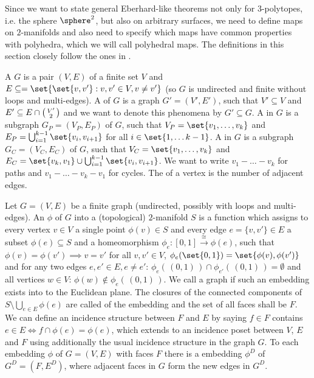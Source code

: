 \label{sec:polymap}

Since we want to state general {\sc Eberhard}-like theorems not only for $3$-polytopes, i.e. the sphere $\sphere^2$, but also on arbitrary surfaces, we need to define maps on $2$-manifolds and also need to specify which maps have common properties with polyhedra, which we will call polyhedral maps. The definitions in this section closely follow the ones in \cite{brehm2004polyhedralmaps}.
\clearpage
\begin{definition}
  A  $G$ is a pair $(V, E)$ of a finite set $V$ and $E \subseteq = \set{\set{v, v'} : v, v' \in V, v \neq v'}$ (so $G$ is undirected and finite without loops and multi-edges). A  of $G$ is a graph $G' = (V', E')$, such that $V' \subseteq V$ and $E' \subseteq E \cap  \begin{psmallmatrix}V'\\2\end{psmallmatrix}$ and we want to denote this phenomena by $G' \subseteq G$. A  in $G$ is a subgraph $G_P = (V_P, E_P)$ of $G$, such that $V_P = \set{v_1, \dots, v_k}$ and $E_P = \bigcup_{i = 1}^{k-1}\set{v_i, v_{i+1}}$ for all $i \in \set{1, \dots k - 1}$. A  in $G$ is a subgraph $G_C = (V_C, E_C)$ of $G$, such that $V_C = \set{v_1, \dots, v_k}$ and $E_C = \set{v_k, v_1} \cup \bigcup_{i = 1}^{k-1}\set{v_i, v_{i+1}}$. We want to write $v_1 - \dots - v_k$ for paths and $v_1 - \dots - v_k - v_1$ for cycles. The  of a vertex is the number of adjacent edges.
\end{definition}

\begin{definition} Let $G = (V, E)$ be a finite graph (undirected, possibly with loops and multi-edges). An  $\phi$ of $G$ into a (topological) $2$-manifold $S$ is a function which assigns to every vertex $v \in V$ a single point $\phi(v) \in S$ and every edge $e = \{v, v'\} \in E$ a subset $\phi(e) \subseteq S$ and a homeomorphism $\phi_e : [0, 1] \stackrel{\cong}{\longrightarrow} \phi(e)$, such that $\phi(v) = \phi(v') \implies v = v'$ for all $v, v' \in V$, $\phi_e(\set{0, 1}) = \set{\phi(v), \phi(v')}$ and for any two edges $e, e' \in E, e \neq e'$: $\phi_e(\,(0,1)\,) \cap \phi_{e'}(\,(0,1)\,) = \emptyset$ and all vertices $w \in V$: $\phi(w) \not\in \phi_e(\,(0,1)\,)$. We call a graph  if such an embedding exists into to the Euclidean plane. The closures of the connected components of $S \setminus \bigcup_{e \in E} \phi(e)$ are called  of the embedding and the set of all faces shall be $F$. We can define an incidence structure between $F$ and $E$ by saying $f \in F$ contains $e \in E \iff f \cap \phi(e) = \phi(e)$, which extends to an incidence poset between $V$, $E$ and $F$ using additionally the usual incidence structure in the graph $G$. To each embedding $\phi$ of $G = (V, E)$ with faces $F$ there is a  embedding $\phi^D$ of $G^D = (F, E^D)$, where adjacent faces in $G$ form the new edges in $G^D$.
\end{definition}

